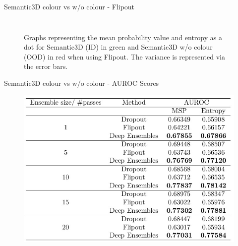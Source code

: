 \documentclass[aspectratio=169]{beamer}
\begin{document}
\begin{frame}{Semantic3D colour vs w/o colour - Flipout}
\begin{columns}
\begin{column}{0.5\textwidth}
\begin{figure}
            \end{figure}
        \end{column}
    \end{columns}
    \begin{figure}
        \caption{Graphs representing the mean probability value and entropy as a dot for Semantic3D (ID) in green and
        Semantic3D w/o colour (OOD) in red when using Flipout. The variance is represented via the error bars.}
    \end{figure}
\end{frame}

\begin{frame}{Semantic3D colour vs w/o colour - AUROC Scores}
    \begin{figure}
        \centering
        \includegraphics[scale=0.33]{images/ood2/AUROC_OOD2.jpg}
    \end{figure}
    \begin{table}
        \caption{AUROC scores in case of Semantic3D-vs-Semantic3D without colour for Dropout, Flipout, and
        Deep Ensembles generated using MSP and entropy values for various ensemble sizes and forward passes.}
    \end{table}
\end{frame}
\end{document}

